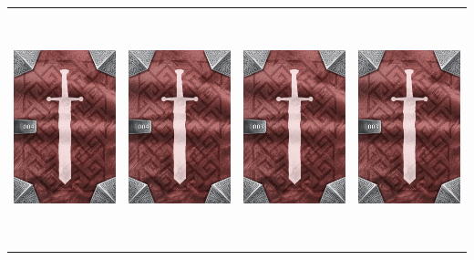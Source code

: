 \documentclass{minimal}
\begin{document}
{\begin{longtable}{llll}
\includegraphics[width=44mm,height=68mm]{./1-14/gh-004-leather-armor-back.png} &
\includegraphics[width=44mm,height=68mm]{./1-14/gh-004-leather-armor-back.png} &
\includegraphics[width=44mm,height=68mm]{./1-14/gh-003-hide-armor-back.png} &
\includegraphics[width=44mm,height=68mm]{./1-14/gh-003-hide-armor-back.png}\\ 

\end{longtable}}
\end{document}
